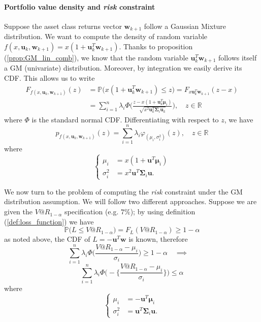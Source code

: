 \paragraph{Portfolio value density and \textit{risk} constraint}
Suppose the asset class returns vector $\bm{w}_{k+1}$ follow a Gaussian Mixture distribution. We want to compute the density of random variable $f(x,\bm{u}_k,\bm{w}_{k+1}) = x(1 + \bm{u}_k^T\bm{w}_{k+1})$. Thanks to proposition (\ref{prop:GM_lin_comb}), we know that the random variable $\bm{u}_k^T\bm{w}_{k+1}$ follows itself a \gls{GM} (univariate) distribution. Moreover, by integration we easily derive its \gls{CDF}. This allows us to write
\begin{align*}
F_{f(x,\bm{u}_k,\bm{w}_{k+1})}(z) & = \mathbb{P}\big(x(1+\bm{u}_k^T\bm{w}_{k+1})\leq z \big) = F_{x\bm{u}_k^T\bm{w}_{k+1}}(z-x)\\
& = \sum_{i=1}^{n}\lambda_i \Phi\Big(\frac{z - x(1+\bm{u}_k^T\bm{\mu}_i)}{\sqrt{x^2\bm{u}_k^T\bm{\Sigma}_i\bm{u}_k}}\Big), \quad z \in \mathbb{R}
\end{align*}
where $\Phi$ is the standard normal CDF. Differentiating with respect to $z$, we have
\begin{equation}
\boxed{p_{f(x,\bm{u}_k,\bm{w}_{k+1})}(z) = \sum_{i=1}^{n}\lambda_i \varphi_{(\mu_i,\sigma_i^2)}(z), \quad z \in \mathbb{R}}
\end{equation}
where 
\[
\begin{cases}
	\mu_i &= x(1+\bm{u}^T \bm{\mu}_i) \\
	\sigma_i^2 & = x^2\bm{u}^T\bm{\Sigma}_i \bm{u}.
\end{cases}
\]


We now turn to the problem of computing the \textit{risk} constraint under the GM distribution assumption. We will follow two different approaches. Suppose we are given the $V@R_{1-\alpha}$ specification (e.g. $7\%$); by using definition (\ref{def:loss_function}) we have \[ \mathbb{P}\big(L \leq V@R_{1-\alpha} \big) = F_L(V@R_{1-\alpha}) \geq 1-\alpha \] as noted above, the CDF of $L = -\bm{u}^T \bm{w}$ is known, therefore \[\sum_{i=1}^{n}\lambda_i \Phi\Big(\frac{V@R_{1-\alpha} - \mu_i}{\sigma_i}\Big) \geq 1-\alpha \quad \implies \quad\]
\begin{equation}
 \boxed{\sum_{i=1}^{n}\lambda_i \Phi\Big(-\Big\{\frac{V@R_{1-\alpha} - \mu_i}{\sigma_i} \Big\} \Big) \leq \alpha}  
\end{equation}
where \[
\begin{cases}
\mu_i & = -\bm{u}^T \bm{\mu}_i \\
\sigma_i^2 & = \bm{u}^T \bm{\Sigma}_i \bm{u}.
\end{cases}\]



